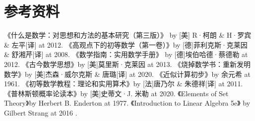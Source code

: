 \documentclass[12pt,oneside]{book}
\begin{document}
\part*{参考资料}
\begin{thebibliography}{99}
 《什么是数学：对思想和方法的基本研究（第三版）》 by [美] R·柯朗 \& H·罗宾 \&  左平[译]  at 2012.
 《高观点下的初等数学（第一卷）》by [德]菲利克斯·克莱因 \& 舒湘芹[译] at 2008.
 《数学指南：实用数学手册》 by [德]埃伯哈德·蔡德勒 at 2012. 
 《古今数学思想》by [美]莫里斯·克莱因 at 2013.
 《烧掉数学书：重新发明数学》by [美]杰森·威尔克斯 \& 唐璐[译] at 2020.
 《近似计算初步》by 余元希 at 1961.
 《初等数学教程：理论和实用算术》by [法]唐乃尔 \& 朱德祥[译] at 2011.
 《普林斯顿概率论读本》by [美]史蒂文·J. 米勒 at 2020.
 《Elements of Set Theory》by Herbert B. Enderton at 1977.
 《Introduction to Linear Algebra 5e》 by Gilbert Strang at 2016 .
\end{thebibliography}
\end{document}
